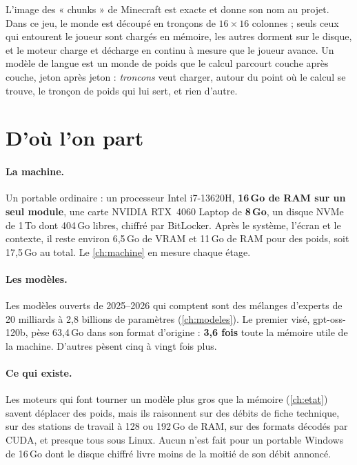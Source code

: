 L'image des « chunks » de Minecraft est exacte et donne son nom au projet. Dans ce jeu, le monde est découpé en tronçons de $16 \times 16$ colonnes ; seuls ceux qui entourent le joueur sont chargés en mémoire, les autres dorment sur le disque, et le moteur charge et décharge en continu à mesure que le joueur avance. Un modèle de langue est un monde de poids que le calcul parcourt couche après couche, jeton après jeton : \emph{troncons} veut charger, autour du point où le calcul se trouve, le tronçon de poids qui lui sert, et rien d'autre.

\section{D'où l'on part}\label{sec:depart}

\paragraph{La machine.} Un portable ordinaire : un processeur Intel i7-13620H, \textbf{16\,Go de RAM sur un seul module}, une carte NVIDIA RTX~4060 Laptop de \textbf{8\,Go}, un disque NVMe de 1\,To dont 404\,Go libres, chiffré par BitLocker. Après le système, l'écran et le contexte, il reste environ 6,5\,Go de VRAM et 11\,Go de RAM pour des poids, soit 17,5\,Go au total. Le \cref{ch:machine} en mesure chaque étage.

\paragraph{Les modèles.} Les modèles ouverts de 2025--2026 qui comptent sont des mélanges d'experts de 20 milliards à 2,8 billions de paramètres (\cref{ch:modeles}). Le premier visé, gpt-oss-120b, pèse 63,4\,Go dans son format d'origine : \textbf{3,6 fois} toute la mémoire utile de la machine. D'autres pèsent cinq à vingt fois plus.

\paragraph{Ce qui existe.} Les moteurs qui font tourner un modèle plus gros que la mémoire (\cref{ch:etat}) savent déplacer des poids, mais ils raisonnent sur des débits de fiche technique, sur des stations de travail à 128 ou 192\,Go de RAM, sur des formats décodés par CUDA, et presque tous sous Linux. Aucun n'est fait pour un portable Windows de 16\,Go dont le disque chiffré livre moins de la moitié de son débit annoncé.

